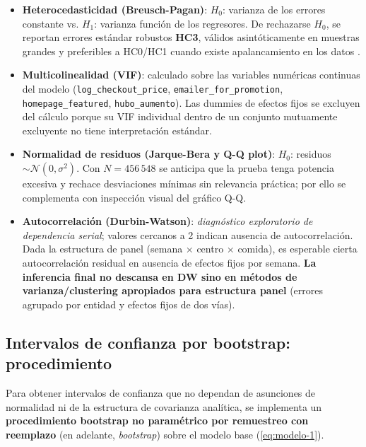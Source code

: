 \documentclass[doc, a4paper, biblatex, floatsintext, longtable, babel]{apa7}
\begin{document}
\begin{itemize}
    \item \textbf{Heterocedasticidad (Breusch-Pagan)}: $H_0$: varianza de los errores constante vs. $H_1$: varianza funci\'on de los regresores. De rechazarse $H_0$, se reportan errores est\'andar robustos \textbf{HC3}, v\'alidos asint\'oticamente en muestras grandes \parencite{davidson1994stochastic} y preferibles a HC0/HC1 cuando existe apalancamiento en los datos \parencite{long2000heteroscedasticity}.
    \item \textbf{Multicolinealidad (VIF)}: calculado sobre las variables num\'ericas continuas del modelo (\texttt{log\_checkout\_price}, \texttt{emailer\_for\_promotion}, \texttt{homepage\_featured}, \texttt{hubo\_aumento}). Las dummies de efectos fijos se excluyen del c\'alculo porque su VIF individual dentro de un conjunto mutuamente excluyente no tiene interpretaci\'on est\'andar.
    \item \textbf{Normalidad de residuos (Jarque-Bera y Q-Q plot)}: $H_0$: residuos $\sim \mathcal{N}(0,\sigma^2)$. Con $N=456\,548$ se anticipa que la prueba tenga potencia excesiva y rechace desviaciones m\'inimas sin relevancia pr\'actica; por ello se complementa con inspecci\'on visual del gr\'afico Q-Q.
    \item \textbf{Autocorrelaci\'on (Durbin-Watson)}: \textit{diagnóstico exploratorio de dependencia serial}; valores cercanos a 2 indican ausencia de autocorrelaci\'on. Dada la estructura de panel (semana $\times$ centro $\times$ comida), es esperable cierta autocorrelaci\'on residual en ausencia de efectos fijos por semana. \textbf{La inferencia final no descansa en DW sino en métodos de varianza/clustering apropiados para estructura panel} (errores agrupado por entidad y efectos fijos de dos vías).
\end{itemize}

\subsection{Intervalos de confianza por bootstrap: procedimiento}
\label{sec:bootstrap}

Para obtener intervalos de confianza que no dependan de asunciones de normalidad ni de la estructura de covarianza anal\'itica, se implementa un \textbf{procedimiento bootstrap no param\'etrico por remuestreo con reemplazo} (en adelante, \textit{bootstrap}) sobre el modelo base (\cref{eq:modelo-1}).
\end{document}
